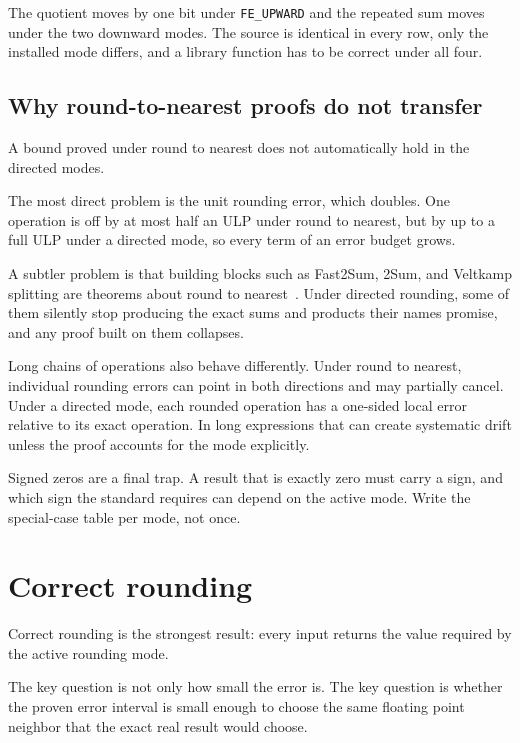 \documentclass[manuscript, nonacm]{acmart}
\begin{document}
    The quotient moves by one bit under \texttt{FE\_UPWARD} and the repeated
    sum moves under the two downward modes. The source is identical in every
    row, only the installed mode differs, and a library function has to be
    correct under all four.

    \subsection{Why round-to-nearest proofs do not transfer}

    A bound proved under round to nearest does not automatically hold in the
    directed modes.

    The most direct problem is the unit rounding error, which doubles. One
    operation is off by at most half an ULP under round to nearest, but by up
    to a full ULP under a directed mode, so every term of an error budget
    grows.

    A subtler problem is that building blocks such as Fast2Sum, 2Sum, and
    Veltkamp splitting are theorems about round to
    nearest~\cite{muller,handbook}. Under directed rounding, some of them
    silently stop producing the exact sums and products their names promise,
    and any proof built on them collapses.

    Long chains of operations also behave differently. Under round to
    nearest, individual rounding errors can point in both directions and may
    partially cancel. Under a directed mode, each rounded operation has a
    one-sided local error relative to its exact operation. In long expressions
    that can create systematic drift unless the proof accounts for the mode
    explicitly.

    Signed zeros are a final trap. A result that is exactly zero must carry
    a sign, and which sign the standard requires can depend on the active
    mode. Write the special-case table per mode, not once.



    \section{Correct rounding}

    Correct rounding is the strongest result: every input returns the value
    required by the active rounding mode.

    The key question is not only how small the error is. The key question is
    whether the proven error interval is small enough to choose the same floating
    point neighbor that the exact real result would choose.
\end{document}
